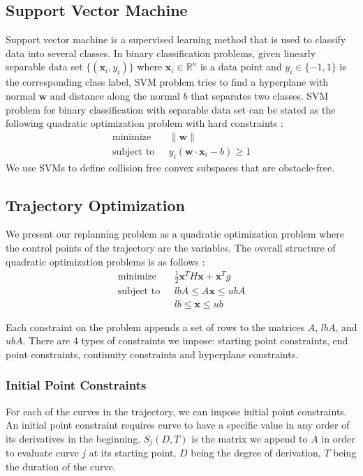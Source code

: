 \documentclass{svproc}
\newcommand{\vw}{\mathbf{w}}
\newcommand{\vx}{\mathbf{x}}
\newcommand{\R}{\mathbb{R}} %
\begin{document}
\subsection{Support Vector Machine}
Support vector machine is a supervised learning method that is used to classify data into several classes. In binary classification problems, given linearly separable data set $\{(\vx_i, y_i)\}$ where $\vx_i \in \R^n$ is a data point and $y_i \in \{-1, 1\}$ is the corresponding class label, SVM problem tries to find a hyperplane with normal $\vw$ and distance along the normal $b$ that separates two classes. SVM problem for binary classification with separable data set can be stated as the following quadratic optimization problem with hard constraints \cite{SVM}:
\begin{align*}
    \text{minimize}\ \ \  &\|\vw\|\\
    \text{subject to}\ \ \  & y_i(\vw \cdot \vx_i - b) \geq 1
\end{align*}
We use SVMs to define collision free convex subspaces that are obstacle-free.
\subsection{Trajectory Optimization}
We present our replanning problem as a quadratic optimization problem where the control points of the trajectory are the variables. The overall structure of quadratic optimization problems is as follows \cite{qpOASES}:
\begin{align*}
    \text{minimize}\ \ \ &\frac{1}{2}\vx^TH\vx + \vx^Tg\\
    \text{subject to}\ \ \ & lbA \leq A\vx \leq ubA\\
    &lb \leq \vx \leq ub
\end{align*}

Each constraint on the problem appends a set of rows to the matrices $A$, $lbA$, and $ubA$. There are 4 types of constraints we impose: starting point constraints, end point constraints, continuity constraints and hyperplane constraints.
\subsubsection{Initial Point Constraints}
For each of the curves in the trajectory, we can impose initial point constraints. An initial point constraint requires curve to have a specific value in any order of its derivatives in the beginning. $S_j(D, T)$ is the matrix we append to $A$ in order to evaluate curve $j$ at its starting point, $D$ being the degree of derivation, $T$ being the duration of the curve.
\end{document}
